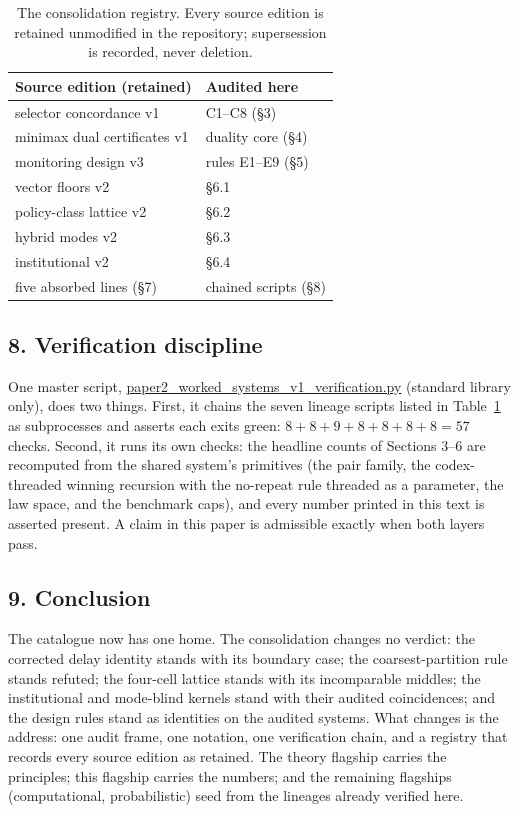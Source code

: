 \documentclass[10pt,twocolumn]{article}
\theoremstyle{definition}
\begin{document}
\begin{table}[h]
\centering
\footnotesize
\begin{tabular}{@{}p{}p{}@{}}
\toprule
Source edition (retained) & Audited here \\
\midrule
selector concordance v1 & C1--C8 (\S3) \\
minimax dual certificates v1 & duality core (\S4) \\
monitoring design v3 & rules E1--E9 (\S5) \\
vector floors v2 & \S6.1 \\
policy-class lattice v2 & \S6.2 \\
hybrid modes v2 & \S6.3 \\
institutional v2 & \S6.4 \\
five absorbed lines (\S7) & chained scripts (\S8) \\
\bottomrule
\end{tabular}
\caption{The consolidation registry. Every source edition is retained
unmodified in the repository; supersession is recorded, never deletion.}
\label{tab:registry}
\end{table}

\subsection{8. Verification discipline}\label{verification}

One master script,
\url{paper2_worked_systems_v1_verification.py} (standard library
only), does two things. First, it chains the seven lineage scripts listed in
Table~\ref{tab:registry} as subprocesses and asserts each exits green:
\(8 + 8 + 9 + 8 + 8 + 8 + 8 = 57\) checks. Second, it runs its own checks:
the headline counts of Sections 3--6 are recomputed from the shared system's
primitives (the pair family, the codex-threaded winning recursion with the
no-repeat rule threaded as a parameter, the law space, and the benchmark
caps), and every number printed in this text is asserted present. A claim in
this paper is admissible exactly when both layers pass.

\subsection{9. Conclusion}\label{conclusion}

The catalogue now has one home. The consolidation changes no verdict: the
corrected delay identity stands with its boundary case; the coarsest-partition
rule stands refuted; the four-cell lattice stands with its incomparable
middles; the institutional and mode-blind kernels stand with their audited
coincidences; and the design rules stand as identities on the audited
systems. What changes is the address: one audit frame, one notation, one
verification chain, and a registry that records every source edition as
retained. The theory flagship carries the principles; this flagship carries
the numbers; and the remaining flagships (computational, probabilistic) seed
from the lineages already verified here.
\end{document}
